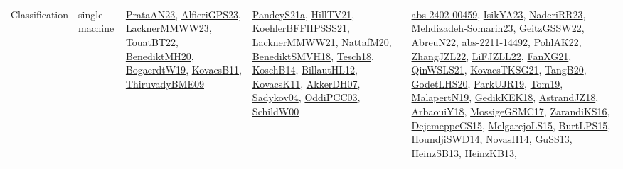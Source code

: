 {\begin{longtable}{lp{3cm}>{\raggedright}p{6cm}>{\raggedright}p{6cm}p{8cm}}
Classification & single machine & \href{articles/PrataAN23.pdf}{PrataAN23}\cite{PrataAN23}, \href{articles/AlfieriGPS23.pdf}{AlfieriGPS23}\cite{AlfieriGPS23}, \href{articles/LacknerMMWW23.pdf}{LacknerMMWW23}\cite{LacknerMMWW23}, \href{papers/TouatBT22.pdf}{TouatBT22}\cite{TouatBT22}, \href{articles/BenediktMH20.pdf}{BenediktMH20}\cite{BenediktMH20}, \href{papers/BogaerdtW19.pdf}{BogaerdtW19}\cite{BogaerdtW19}, \href{articles/KovacsB11.pdf}{KovacsB11}\cite{KovacsB11}, \href{papers/ThiruvadyBME09.pdf}{ThiruvadyBME09}\cite{ThiruvadyBME09} & \href{articles/PandeyS21a.pdf}{PandeyS21a}\cite{PandeyS21a}, \href{papers/HillTV21.pdf}{HillTV21}\cite{HillTV21}, \href{articles/KoehlerBFFHPSSS21.pdf}{KoehlerBFFHPSSS21}\cite{KoehlerBFFHPSSS21}, \href{papers/LacknerMMWW21.pdf}{LacknerMMWW21}\cite{LacknerMMWW21}, \href{papers/NattafM20.pdf}{NattafM20}\cite{NattafM20}, \href{papers/BenediktSMVH18.pdf}{BenediktSMVH18}\cite{BenediktSMVH18}, \href{papers/Tesch18.pdf}{Tesch18}\cite{Tesch18}, \href{papers/KoschB14.pdf}{KoschB14}\cite{KoschB14}, \href{papers/BillautHL12.pdf}{BillautHL12}\cite{BillautHL12}, \href{articles/KovacsK11.pdf}{KovacsK11}\cite{KovacsK11}, \href{papers/AkkerDH07.pdf}{AkkerDH07}\cite{AkkerDH07}, \href{papers/Sadykov04.pdf}{Sadykov04}\cite{Sadykov04}, \href{papers/OddiPCC03.pdf}{OddiPCC03}\cite{OddiPCC03}, \href{articles/SchildW00.pdf}{SchildW00}\cite{SchildW00} & \href{articles/abs-2402-00459.pdf}{abs-2402-00459}\cite{abs-2402-00459}, \href{articles/IsikYA23.pdf}{IsikYA23}\cite{IsikYA23}, \href{articles/NaderiRR23.pdf}{NaderiRR23}\cite{NaderiRR23}, \href{papers/Mehdizadeh-Somarin23.pdf}{Mehdizadeh-Somarin23}\cite{Mehdizadeh-Somarin23}, \href{papers/GeitzGSSW22.pdf}{GeitzGSSW22}\cite{GeitzGSSW22}, \href{articles/AbreuN22.pdf}{AbreuN22}\cite{AbreuN22}, \href{articles/abs-2211-14492.pdf}{abs-2211-14492}\cite{abs-2211-14492}, \href{articles/PohlAK22.pdf}{PohlAK22}\cite{PohlAK22}, \href{papers/ZhangJZL22.pdf}{ZhangJZL22}\cite{ZhangJZL22}, \href{papers/LiFJZLL22.pdf}{LiFJZLL22}\cite{LiFJZLL22}, \href{articles/FanXG21.pdf}{FanXG21}\cite{FanXG21}, \href{articles/QinWSLS21.pdf}{QinWSLS21}\cite{QinWSLS21}, \href{papers/KovacsTKSG21.pdf}{KovacsTKSG21}\cite{KovacsTKSG21}, \href{papers/TangB20.pdf}{TangB20}\cite{TangB20}, \href{papers/GodetLHS20.pdf}{GodetLHS20}\cite{GodetLHS20}, \href{papers/ParkUJR19.pdf}{ParkUJR19}\cite{ParkUJR19}, \href{papers/Tom19.pdf}{Tom19}\cite{Tom19}, \href{papers/MalapertN19.pdf}{MalapertN19}\cite{MalapertN19}, \href{articles/GedikKEK18.pdf}{GedikKEK18}\cite{GedikKEK18}, \href{papers/AstrandJZ18.pdf}{AstrandJZ18}\cite{AstrandJZ18}, \href{papers/ArbaouiY18.pdf}{ArbaouiY18}\cite{ArbaouiY18}, \href{papers/MossigeGSMC17.pdf}{MossigeGSMC17}\cite{MossigeGSMC17}, \href{articles/ZarandiKS16.pdf}{ZarandiKS16}\cite{ZarandiKS16}, \href{papers/DejemeppeCS15.pdf}{DejemeppeCS15}\cite{DejemeppeCS15}, \href{papers/MelgarejoLS15.pdf}{MelgarejoLS15}\cite{MelgarejoLS15}, \href{papers/BurtLPS15.pdf}{BurtLPS15}\cite{BurtLPS15}, \href{papers/HoundjiSWD14.pdf}{HoundjiSWD14}\cite{HoundjiSWD14}, \href{articles/NovasH14.pdf}{NovasH14}\cite{NovasH14}, \href{papers/GuSS13.pdf}{GuSS13}\cite{GuSS13}, \href{articles/HeinzSB13.pdf}{HeinzSB13}\cite{HeinzSB13}, \href{papers/HeinzKB13.pdf}{HeinzKB13}\cite{HeinzKB13}, 
\end{longtable}}
